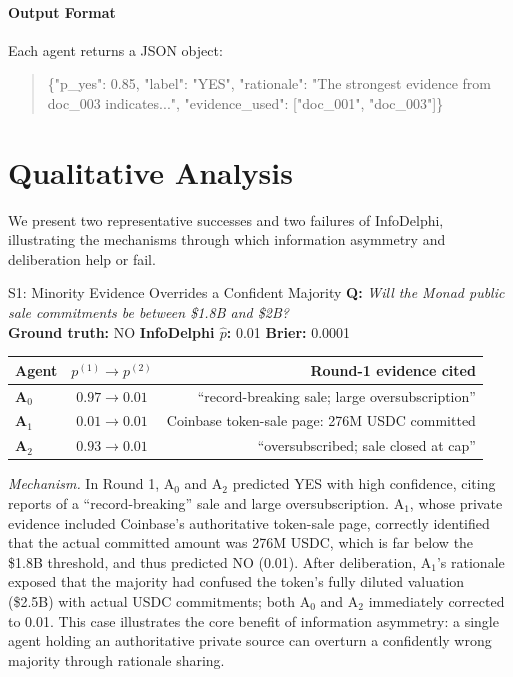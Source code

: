 \documentclass[11pt]{article}
\theoremstyle{plain}
\theoremstyle{definition}
\newcommand{\agA}[1]{\textcolor{agA}{\textbf{#1}}}
\newcommand{\agB}[1]{\textcolor{agB}{\textbf{#1}}}
\newcommand{\agC}[1]{\textcolor{agC}{\textbf{#1}}}
\begin{document}
\paragraph{Output Format}

Each agent returns a JSON object:
\begin{quote}
\small\ttfamily
\{"p\_yes": 0.85, "label": "YES", "rationale": "The strongest evidence from doc\_003 indicates...", "evidence\_used": {[}"doc\_001", "doc\_003"{]}\}
\end{quote}

\section{Qualitative Analysis}
\label{sec:appendix_cases}

We present two representative successes and two failures of InfoDelphi,
illustrating the mechanisms through which information asymmetry and
deliberation help or fail.

\begin{successcase}{S1: Minority Evidence Overrides a Confident Majority}
\textbf{Q:} \textit{Will the Monad public sale commitments be between \$1.8B and \$2B?}\\[2pt]
\textbf{Ground truth:} NO \quad \textbf{InfoDelphi $\hat{p}$:} 0.01 \quad \textbf{Brier:} 0.0001

\smallskip
\setlength{\tabcolsep}{4pt}
\renewcommand{\arraystretch}{1.2}
\begin{tabularx}{\linewidth}{@{}l c R@{}}
\toprule
\textbf{Agent} & $p^{(1)}\!\to\!p^{(2)}$ & \textbf{Round-1 evidence cited} \\
\midrule
\agA{A$_0$} & $0.97 \to 0.01$ & ``record-breaking sale; large oversubscription'' \\
\agB{A$_1$} & $0.01 \to 0.01$ & Coinbase token-sale page: 276M USDC committed \\
\agC{A$_2$} & $0.93 \to 0.01$ & ``oversubscribed; sale closed at cap'' \\
\bottomrule
\end{tabularx}

\smallskip
\textit{Mechanism.} In Round 1, A$_0$ and A$_2$ predicted YES with high
confidence, citing reports of a ``record-breaking'' sale and large
oversubscription. A$_1$, whose private evidence included Coinbase's
authoritative token-sale page, correctly identified that the actual committed
amount was 276M USDC, which is far below the \$1.8B threshold, and thus
predicted NO (0.01). After deliberation, A$_1$'s rationale exposed that the
majority had confused the token's fully diluted valuation (\$2.5B) with actual
USDC commitments; both A$_0$ and A$_2$ immediately corrected to 0.01. This
case illustrates the core benefit of information asymmetry: a single agent
holding an authoritative private source can overturn a confidently wrong
majority through rationale sharing.
\end{successcase}
\end{document}
